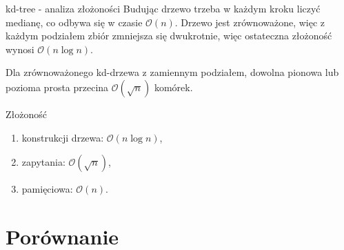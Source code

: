 \documentclass[aspectratio=169,dvipsnames]{beamer}
\newcommand{\sO}{\mathcal O}
\begin{document}
\begin{frame}{kd-tree - analiza złożoności}
    Budując drzewo trzeba w każdym kroku liczyć medianę, co odbywa się w czasie $\sO(n)$.
    Drzewo jest zrównoważone, więc z każdym podziałem zbiór zmniejsza się dwukrotnie,
    więc ostateczna złożoność wynosi $\sO(n \log n)$.

    \begin{lemma}[o kd-drzewie]
        Dla zrównoważonego kd-drzewa z zamiennym podziałem, dowolna pionowa lub pozioma prosta przecina $\sO(\sqrt n)$ komórek.
    \end{lemma}

    Złożoność
    \begin{enumerate}
    \item konstrukcji drzewa: $\sO(n\log n)$,
    \item zapytania: $\sO(\sqrt n)$,
    \item pamięciowa: $\sO(n)$.
    \end{enumerate}
\end{frame}

\section{Porównanie}
\end{document}
